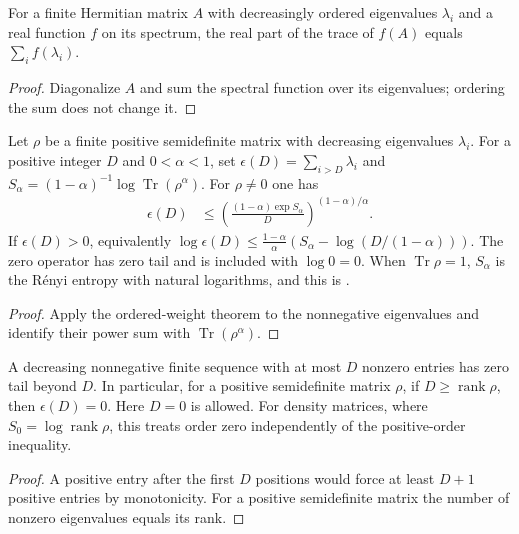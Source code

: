 \begin{theorem}
    \label{thm:trace_power_ordered_spectrum}
    \leanok
    For a finite Hermitian matrix $A$ with decreasingly ordered
    eigenvalues $\lambda_i$ and a real function $f$ on its spectrum,
    the real part of the trace of $f(A)$ equals $\sum_i f(\lambda_i)$.
\end{theorem}
\begin{proof}
    \leanok
    Diagonalize $A$ and sum the spectral function over its eigenvalues;
    ordering the sum does not change it.
\end{proof}

\begin{theorem}
    \label{thm:matrix_renyi_tail}
    \leanok
    Let $\rho$ be a finite positive semidefinite matrix with decreasing
    eigenvalues $\lambda_i$. For a positive integer $D$ and
    $0<\alpha<1$, set
    $\epsilon(D)=\sum_{i>D}\lambda_i$ and
    $S_\alpha=(1-\alpha)^{-1}\log\operatorname{Tr}(\rho^\alpha)$.
    For $\rho\neq0$ one has
    \begin{align}
        \epsilon(D)
         & \leq\left(\frac{(1-\alpha)\exp S_\alpha}{D}
        \right)^{(1-\alpha)/\alpha}.
        \label{eq:matrix_renyi_tail}
    \end{align}
    If $\epsilon(D)>0$, equivalently
    $\log\epsilon(D)\leq\frac{1-\alpha}{\alpha}
        (S_\alpha-\log(D/(1-\alpha)))$.
    The zero operator has zero tail and is included with $\log0=0$.
    When $\operatorname{Tr}\rho=1$, $S_\alpha$ is the Rényi entropy
    with natural logarithms, and this is
    \cite[Lemma~2]{VerstraeteCirac2006Faithfully}.
\end{theorem}
\begin{proof}
    \leanok
    Apply the ordered-weight theorem to the nonnegative eigenvalues and
    identify their power sum with $\operatorname{Tr}(\rho^\alpha)$.
\end{proof}

\begin{theorem}
    \label{thm:renyi_zero_rank_tail}
    \leanok
    A decreasing nonnegative finite sequence with at most $D$ nonzero
    entries has zero tail beyond $D$. In particular, for a positive
    semidefinite matrix $\rho$, if $D\geq\operatorname{rank}\rho$,
    then $\epsilon(D)=0$. Here $D=0$ is allowed.
    For density matrices, where $S_0=\log\operatorname{rank}\rho$,
    this treats order zero independently of the positive-order inequality.
\end{theorem}
\begin{proof}
    \leanok
    A positive entry after the first $D$ positions would force at least
    $D+1$ positive entries by monotonicity. For a positive semidefinite
    matrix the number of nonzero eigenvalues equals its rank.
\end{proof}
